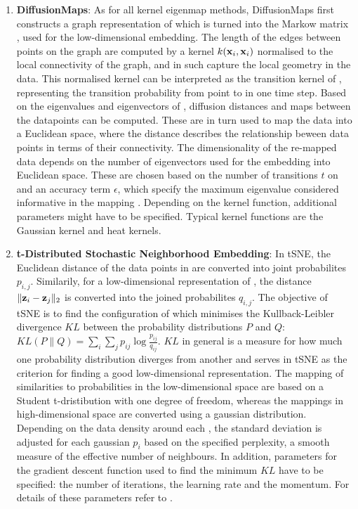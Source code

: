 \begin{enumerate}
\item\textbf{DiffusionMaps}: As for all kernel eigenmap methods, DiffusionMaps first constructs a graph representation of  which is turned into the Markow matrix , used for the low-dimensional embedding. The length of the edges between points on the graph are computed by a kernel \(k(\boldsymbol{\mathbf{x}}_{i},\boldsymbol{\mathbf{x}}_{i})\) normalised to the local connectivity of the graph, and in such capture the local geometry in the data. This normalised kernel can be interpreted as the transition kernel of , representing the transition probability from point  to  in one time step. Based on the eigenvalues and eigenvectors of , diffusion distances and maps between the datapoints can be computed. These are in turn used to map the data into a Euclidean space, where the distance describes the relationship beween data points in terms of their connectivity. The dimensionality of the re-mapped data depends on the number of eigenvectors used for the embedding into Euclidean space. These are chosen based on the number of transitions \(t\) on  and an accuracy term \(\epsilon\), which specify the maximum eigenvalue considered informative in the mapping \citep{Coifman2005,Coifman2006}. Depending on the kernel function, additional parameters might have to be specified. Typical kernel functions are the Gaussian kernel and  heat kernels.

\item\textbf{t-Distributed Stochastic Neighborhood Embedding}: In tSNE, the Euclidean distance of the data points in  are converted into joint probabilites \(p_{i,j}\). Similarily, for  a low-dimensional representation  of , the distance  \(\lVert \boldsymbol{\mathbf{z}}_{i} -\boldsymbol{\mathbf{z}}_{j}\rVert_2 \) is converted into the joined probabilites \(q_{i,j}\). The objective of tSNE is to find the configuration of  which minimises the Kullback-Leibler divergence \(KL\) between the probability distributions \(P\) and \(Q\): \(KL(P\lVert Q) = \sum_i \sum_j p_{ij}\log\frac{p_{ij}}{q_{ij}}\). \(KL\) in general is a measure for how much one probability distribution diverges from another \citep{Kullback1951} and serves in tSNE as the criterion for finding a good low-dimensional representation. The mapping of similarities to probabilities in the low-dimensional space are based on a Student t-dristibution with one degree of freedom, whereas the mappings in high-dimensional space are converted using a gaussian distribution. Depending on the data density around each , the standard deviation is adjusted for each gaussian \(p_i\) based on the specified perplexity, a smooth measure of the effective number of neighbours. In addition, parameters for the gradient descent function used to find the minimum \(KL\) have to be specified:  the number of iterations, the learning rate and the momentum. For details of these parameters refer to \citep{Maaten2008}.
\end{enumerate}


